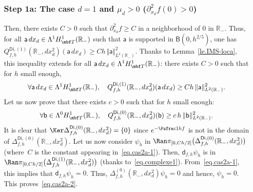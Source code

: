 \subsubsection*{Step 1a: The case $d=1$ and $\mu_{d}>0$ (\ie $ \partial_{x_d}^2 f(0)>0$)}
Then, there exists $C>0$ such that $\partial_{x_d}^2 f\ge C$ in a neighborhood of $0$ in $\mathbb R_-$.
Thus, for all $\mathsf a \, dx_d\in \Lambda^1 H^1_{\mbf T}(\mathbb R_-)$ such that $\mathsf a$ is supported in $\mathsf B(0,h^{2/5 })$, one has $
Q_{f,h}^{\mathsf{Di},(1)}(\mathbb R_-, dx_d^2)(\mathsf a \, dx_d)\ge Ch\, \Vert \mathsf a \Vert_{L^2(\mathbb R_-)}^2$.
Thanks to Lemma~\ref{le.IMS-loca}, this inequality extends for all $\mathsf a \, d x_d\in \Lambda^1 H^1_{\mbf T}(\mathbb R_-)$: there exists $C>0$ such that for $h$ small enough,
\begin{equation}\label{eq.cas2a-1}
\forall \mathsf a\, d x_d\in \Lambda^1 H^1_{\mbf T}(\mathbb R_-), \quad Q_{f,h}^{\mathsf{Di},(1)}(\mathbb R_-, dx_d^2)(\mathsf a \, dx_d)\ge Ch\, \Vert \mathsf a \Vert_{L^2(\mathbb R_-)}^2.
\end{equation}
Let us now prove that there exists $c>0$ such that for $h$ small enough:
\begin{equation}\label{eq.cas2a-2}
\forall \mathsf b\in \Lambda^0 H^1_{\mbf T}(\mathbb R_-),\quad Q_{f,h}^{\mathsf{Di},(0)}(\mathbb R_-, dx_d^2)(\mathsf b)\ge c \, h\, \Vert \mathsf b \Vert_{L^2(\mathbb R_-)}^2.
\end{equation}
It is clear that $\Ker \Delta_{f,h}^{\mathsf{Di},(0)}(\mathbb R_-,
dx_d^2)=\{0\}$ since $e^{-\Psfrac 1hf}$ is not in the domain of
$\Delta_{f,h}^{\mathsf{Di},(0)}(\mathbb R_-, dx_d^2)$. Let us now
consider $\psi_h$ in $\Ran \pi_{[0,Ch/2]}\bigl(\Delta_{f,h}^{\mathsf{Di},(0)}(\mathbb R_-,dx_d^2)\bigr)$
(where~$C$ is the constant appearing in~\eqref{eq.cas2a-1}). Then,
$\mathsf d_{f,h} \psi_h$ is in $\Ran \pi_{[0,Ch/2]}
\bigl(\Delta_{f,h}^{\mathsf{Di},(1)}(\mathbb R_-,dx_d^2) \bigr) $ (thanks to~\eqref{eq.complexe1}). From~\eqref{eq.cas2a-1}, this implies that $\mathsf d_{f,h}\psi_h=0$. Thus, $\Delta_{f,h}^{(0)}(\mathbb R_-, dx_d^2)\psi_h=0$ and hence, $\psi_h=0$. This proves~\eqref{eq.cas2a-2}.

